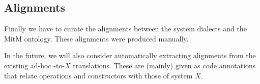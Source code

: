 \subsection{Alignments}

Finally we have to curate the alignments between the system dialects and the MitM ontology.
These alignments were produced manually.

In the future, we will also consider automatically extracting alignments from the existing ad-hoc \Sage-to-$X$ translations.
These are (mainly) given as \Sage code annotations that relate \Sage operations and constructors with those of system $X$.



%





